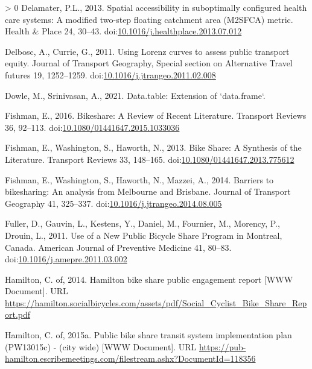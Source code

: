 \documentclass[]{elsarticle} %
\newlength{\cslhangindent}
\newenvironment{CSLReferences}[3] %
 {%
  \setlength{\parindent}{0pt}
  \ifodd #1 \everypar{\setlength{\hangindent}{\cslhangindent}}\ignorespaces\fi
  \ifnum #2 > 0
  \setlength{\parskip}{#2\baselineskip}
  \fi
 }%
 {}
\begin{document}
\begin{CSLReferences}{1}{0}
\leavevmode\hypertarget{ref-delamaterSpatialAccessibilitySuboptimally2013}{}%
Delamater, P.L., 2013. Spatial accessibility in suboptimally configured
health care systems: {A} modified two-step floating catchment area
({M2SFCA}) metric. Health \& Place 24, 30--43.
doi:\href{https://doi.org/10.1016/j.healthplace.2013.07.012}{10.1016/j.healthplace.2013.07.012}

\leavevmode\hypertarget{ref-delboscUsingLorenzCurves2011}{}%
Delbosc, A., Currie, G., 2011. Using {Lorenz} curves to assess public
transport equity. Journal of Transport Geography, Special section on
{Alternative Travel} futures 19, 1252--1259.
doi:\href{https://doi.org/10.1016/j.jtrangeo.2011.02.008}{10.1016/j.jtrangeo.2011.02.008}

\leavevmode\hypertarget{ref-R-data.table}{}%
Dowle, M., Srinivasan, A., 2021. Data.table: Extension of `data.frame`.

\leavevmode\hypertarget{ref-fishmanBikeshareReviewRecent2016}{}%
Fishman, E., 2016. Bikeshare: {A Review} of {Recent Literature}.
Transport Reviews 36, 92--113.
doi:\href{https://doi.org/10.1080/01441647.2015.1033036}{10.1080/01441647.2015.1033036}

\leavevmode\hypertarget{ref-fishmanBikeShareSynthesis2013}{}%
Fishman, E., Washington, S., Haworth, N., 2013. Bike {Share}: {A
Synthesis} of the {Literature}. Transport Reviews 33, 148--165.
doi:\href{https://doi.org/10.1080/01441647.2013.775612}{10.1080/01441647.2013.775612}

\leavevmode\hypertarget{ref-fishmanBarriersBikesharingAnalysis2014}{}%
Fishman, E., Washington, S., Haworth, N., Mazzei, A., 2014. Barriers to
bikesharing: An analysis from {Melbourne} and {Brisbane}. Journal of
Transport Geography 41, 325--337.
doi:\href{https://doi.org/10.1016/j.jtrangeo.2014.08.005}{10.1016/j.jtrangeo.2014.08.005}

\leavevmode\hypertarget{ref-fullerUseNewPublic2011}{}%
Fuller, D., Gauvin, L., Kestens, Y., Daniel, M., Fournier, M., Morency,
P., Drouin, L., 2011. Use of a {New Public Bicycle Share Program} in
{Montreal}, {Canada}. American Journal of Preventive Medicine 41,
80--83.
doi:\href{https://doi.org/10.1016/j.amepre.2011.03.002}{10.1016/j.amepre.2011.03.002}

\leavevmode\hypertarget{ref-hamiltonsobi2014}{}%
Hamilton, C. of, 2014. Hamilton bike share public engagement report
{[}WWW Document{]}. URL
\url{https://hamilton.socialbicycles.com/assets/pdf/Social_Cyclist_Bike_Share_Report.pdf}

\leavevmode\hypertarget{ref-hamiltonsobi2015}{}%
Hamilton, C. of, 2015a. Public bike share transit system implementation
plan (PW13015c) - (city wide) {[}WWW Document{]}. URL
\url{https://pub-hamilton.escribemeetings.com/filestream.ashx?DocumentId=118356}


\end{CSLReferences}
\end{document}
